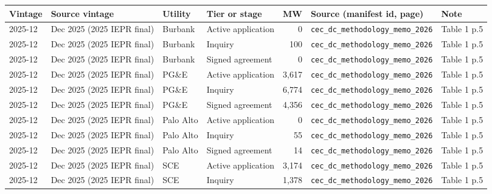 \begin{tabular}{lp{3.2cm}lp{3.4cm}rp{4.2cm}p{5cm}}
\toprule
Vintage & Source vintage & Utility & Tier or stage & MW & Source (manifest id, page) & Note \\
\midrule
2025-12 & Dec 2025 (2025 IEPR final) & Burbank & Active application & 0 & \texttt{cec\_\allowbreak{}dc\_\allowbreak{}methodology\_\allowbreak{}memo\_\allowbreak{}2026} & Table 1 p.5 \\
2025-12 & Dec 2025 (2025 IEPR final) & Burbank & Inquiry & 100 & \texttt{cec\_\allowbreak{}dc\_\allowbreak{}methodology\_\allowbreak{}memo\_\allowbreak{}2026} & Table 1 p.5 \\
2025-12 & Dec 2025 (2025 IEPR final) & Burbank & Signed agreement & 0 & \texttt{cec\_\allowbreak{}dc\_\allowbreak{}methodology\_\allowbreak{}memo\_\allowbreak{}2026} & Table 1 p.5 \\
2025-12 & Dec 2025 (2025 IEPR final) & PG\&E & Active application & 3,617 & \texttt{cec\_\allowbreak{}dc\_\allowbreak{}methodology\_\allowbreak{}memo\_\allowbreak{}2026} & Table 1 p.5 \\
2025-12 & Dec 2025 (2025 IEPR final) & PG\&E & Inquiry & 6,774 & \texttt{cec\_\allowbreak{}dc\_\allowbreak{}methodology\_\allowbreak{}memo\_\allowbreak{}2026} & Table 1 p.5 \\
2025-12 & Dec 2025 (2025 IEPR final) & PG\&E & Signed agreement & 4,356 & \texttt{cec\_\allowbreak{}dc\_\allowbreak{}methodology\_\allowbreak{}memo\_\allowbreak{}2026} & Table 1 p.5 \\
2025-12 & Dec 2025 (2025 IEPR final) & Palo Alto & Active application & 0 & \texttt{cec\_\allowbreak{}dc\_\allowbreak{}methodology\_\allowbreak{}memo\_\allowbreak{}2026} & Table 1 p.5 \\
2025-12 & Dec 2025 (2025 IEPR final) & Palo Alto & Inquiry & 55 & \texttt{cec\_\allowbreak{}dc\_\allowbreak{}methodology\_\allowbreak{}memo\_\allowbreak{}2026} & Table 1 p.5 \\
2025-12 & Dec 2025 (2025 IEPR final) & Palo Alto & Signed agreement & 14 & \texttt{cec\_\allowbreak{}dc\_\allowbreak{}methodology\_\allowbreak{}memo\_\allowbreak{}2026} & Table 1 p.5 \\
2025-12 & Dec 2025 (2025 IEPR final) & SCE & Active application & 3,174 & \texttt{cec\_\allowbreak{}dc\_\allowbreak{}methodology\_\allowbreak{}memo\_\allowbreak{}2026} & Table 1 p.5 \\
2025-12 & Dec 2025 (2025 IEPR final) & SCE & Inquiry & 1,378 & \texttt{cec\_\allowbreak{}dc\_\allowbreak{}methodology\_\allowbreak{}memo\_\allowbreak{}2026} & Table 1 p.5 \\

\end{tabular}

